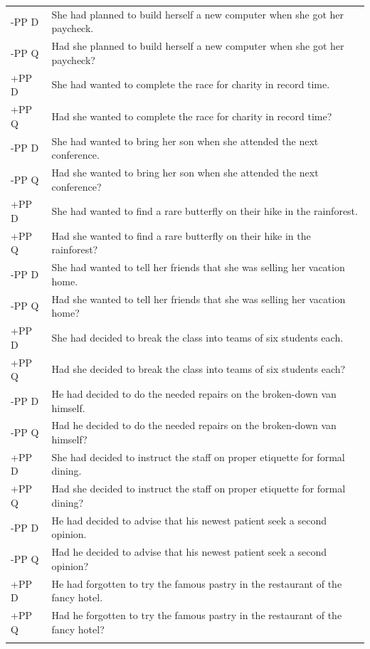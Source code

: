 \documentclass[12pt,oneside]{book}
\begin{document}
\begin{longtable}{ll}
\addlinespace
-PP D & She had planned to build herself a new computer when she got her paycheck.\\
-PP Q & Had she planned to build herself a new computer when she got her paycheck?\\
\addlinespace
+PP D & She had wanted to complete the race for charity in record time.\\
+PP Q & Had she wanted to complete the race for charity in record time?\\
\addlinespace
-PP D & She had wanted to bring her son when she attended the next conference.\\
-PP Q & Had she wanted to bring her son when she attended the next conference?\\
\addlinespace
+PP D & She had wanted to find a rare butterfly on their hike in the rainforest.\\
+PP Q & Had she wanted to find a rare butterfly on their hike in the rainforest?\\
\addlinespace
-PP D & She had wanted to tell her friends that she was selling her vacation home.\\
-PP Q & Had she wanted to tell her friends that she was selling her vacation home?\\
\addlinespace
+PP D & She had decided to break the class into teams of six students each.\\
+PP Q & Had she decided to break the class into teams of six students each?\\
\addlinespace
-PP D & He had decided to do the needed repairs on the broken-down van himself.\\
-PP Q & Had he decided to do the needed repairs on the broken-down van himself?\\
\addlinespace
+PP D & She had decided to instruct the staff on proper etiquette for formal dining.\\
+PP Q & Had she decided to instruct the staff on proper etiquette for formal dining?\\
\addlinespace
-PP D & He had decided to advise that his newest patient seek a second opinion.\\
-PP Q & Had he decided to advise that his newest patient seek a second opinion?\\
\addlinespace
+PP D & He had forgotten to try the famous pastry in the restaurant of the fancy hotel.\\
+PP Q & Had he forgotten to try the famous pastry in the restaurant of the fancy hotel?\\
\addlinespace

\end{longtable}
\end{document}
